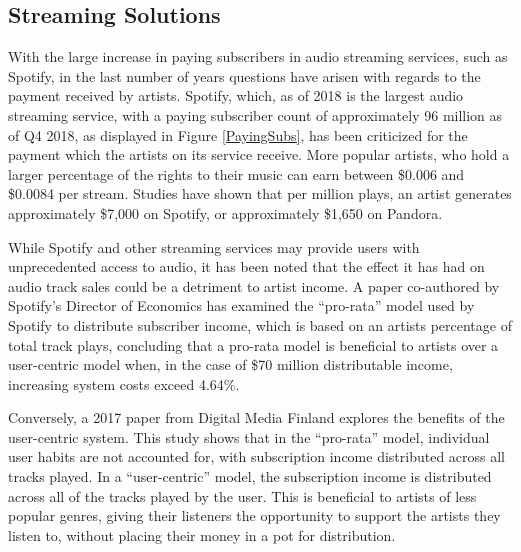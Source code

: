 \documentclass[11pt,a4paper,headinclude=false,footinclude=false]{scrreprt}
\begin{document}
\subsection{Streaming Solutions}\label{streaming-solutions}

With the large increase in paying subscribers in audio streaming
services, such as Spotify, in the last number of years questions have
arisen with regards to the payment received by artists. Spotify, which,
as of 2018\cite{SpotPay18} is the largest audio streaming service, with
a paying subscriber count of approximately 96 million as of Q4
2018\cite{SpotSubs18}, as displayed in Figure \ref{PayingSubs}, has been
criticized for the payment which the artists on its service receive.
More popular artists, who hold a larger percentage of the rights to
their music can earn between \$0.006 and \$0.0084 per stream. Studies
have shown that per million plays, an artist generates approximately
\$7,000 on Spotify, or approximately \$1,650 on
Pandora\cite{CNBCSpot18}.

While Spotify and other streaming services may provide users with
unprecedented access to audio, it has been noted that the effect it has
had on audio track sales could be a detriment to artist income. A paper
co-authored by Spotify's Director of Economics has examined the
``pro-rata'' model used by Spotify to distribute subscriber income,
which is based on an artists percentage of total track plays, concluding
that a pro-rata model is beneficial to artists over a user-centric model
when, in the case of \$70 million distributable income, increasing
system costs exceed 4.64\%\cite{allocateRevenue}.

Conversely, a 2017 paper from Digital Media Finland explores the
benefits of the user-centric system\cite{rataVuser}. This study shows
that in the ``pro-rata'' model, individual user habits are not accounted
for, with subscription income distributed across all tracks played. In a
``user-centric'' model, the subscription income is distributed across
all of the tracks played by the user. This is beneficial to artists of
less popular genres, giving their listeners the opportunity to support
the artists they listen to, without placing their money in a pot for
distribution.
\end{document}

